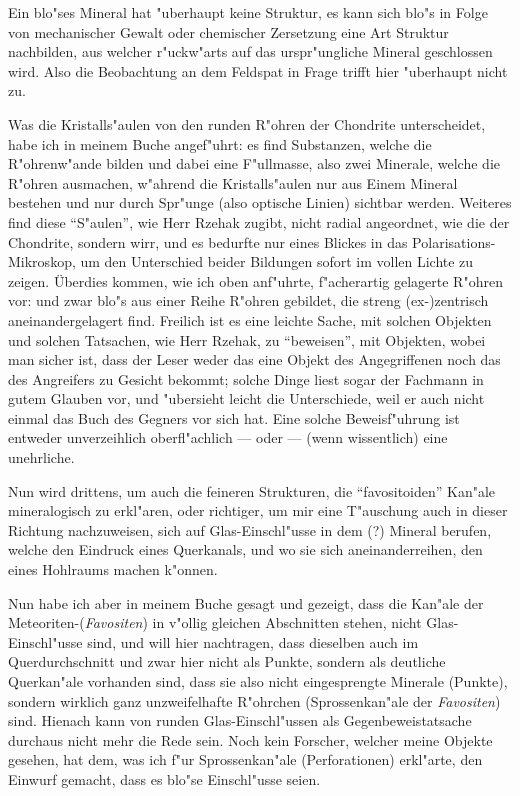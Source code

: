 \documentclass[a4paper, 12pt, oneside]{article}
\begin{document}
Ein blo"ses Mineral hat "uberhaupt keine Struktur, es kann sich blo"s in Folge von mechanischer Gewalt oder chemischer Zersetzung eine Art Struktur nachbilden, aus welcher r"uckw"arts auf das urspr"ungliche Mineral geschlossen wird. Also die Beobachtung an dem Feldspat in Frage trifft hier "uberhaupt nicht zu.

Was die Kristalls"aulen von den runden R"ohren der Chondrite unterscheidet, habe ich in meinem Buche angef"uhrt: es find Substanzen, welche die R"ohrenw"ande bilden und dabei eine F"ullmasse, also zwei Minerale, welche die R"ohren ausmachen, w"ahrend die Kristalls"aulen nur aus Einem Mineral bestehen und nur durch Spr"unge (also optische Linien) sichtbar werden. Weiteres find diese "`S"aulen"', wie Herr Rzehak zugibt, nicht radial angeordnet, wie die der Chondrite, sondern wirr, und es bedurfte nur eines Blickes in das Polarisations-Mikroskop, um den Unterschied beider Bildungen sofort im vollen Lichte zu zeigen. Überdies kommen, wie ich oben anf"uhrte, f"acherartig gelagerte R"ohren vor: und zwar blo"s aus einer Reihe R"ohren gebildet, die streng (ex-)zentrisch aneinandergelagert find. Freilich ist es eine leichte Sache, mit solchen Objekten und solchen Tatsachen, wie Herr Rzehak, zu "`beweisen"', mit Objekten, wobei man sicher ist, dass der Leser weder das eine Objekt des Angegriffenen noch das des Angreifers zu Gesicht bekommt; solche Dinge liest sogar der Fachmann in gutem Glauben vor, und "ubersieht leicht die Unterschiede, weil er auch nicht einmal das Buch des Gegners vor sich hat. Eine solche Beweisf"uhrung ist entweder unverzeihlich oberfl"achlich --- oder --- (wenn wissentlich) eine unehrliche.

Nun wird drittens, um auch die feineren Strukturen, die "`favositoiden"' Kan"ale mineralogisch zu erkl"aren, oder richtiger, um mir eine T"auschung auch in dieser Richtung nachzuweisen, sich auf Glas-Einschl"usse in dem (?) Mineral berufen, welche den Eindruck eines Querkanals, und wo sie sich aneinanderreihen, den eines Hohlraums machen k"onnen.

Nun habe ich aber in meinem Buche gesagt und gezeigt, dass die Kan"ale der Meteoriten-(\emph{Favositen}) in v"ollig gleichen Abschnitten stehen, nicht Glas-Einschl"usse sind, und will hier nachtragen, dass dieselben auch im Querdurchschnitt und zwar hier nicht als Punkte, sondern als deutliche Querkan"ale vorhanden sind, dass sie also nicht eingesprengte Minerale (Punkte), sondern wirklich ganz unzweifelhafte R"ohrchen (Sprossenkan"ale der \emph{Favositen}) sind. Hienach kann von runden Glas-Einschl"ussen als Gegenbeweistatsache durchaus nicht mehr die Rede sein. Noch kein Forscher, welcher meine Objekte gesehen, hat dem, was ich f"ur Sprossenkan"ale (Perforationen) erkl"arte, den Einwurf gemacht, dass es blo"se Einschl"usse seien.
\end{document}
